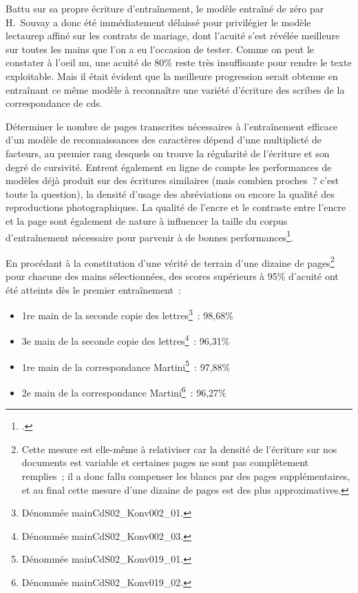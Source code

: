 \documentclass[a4paper,12pt,twoside]{book}
\begin{document}
				Battu sur sa propre écriture d'entraînement, le modèle entraîné de zéro par H.~Souvay a donc été immédiatement délaissé pour privilégier le modèle \gls{lectaurep} affiné sur les contrats de mariage, dont l'acuité s'est révélée meilleure sur toutes les mains que l'on a eu l'occasion de tester. Comme on peut le constater à l'oeil nu, une acuité de 80\% reste très insuffisante pour rendre le texte exploitable. Mais il était évident que la meilleure progression serait obtenue en entraînant ce même modèle à reconnaître une variété d'écriture des scribes de la correspondance de \gls{cds}.
				
				Déterminer le nombre de pages transcrites nécessaires à l'entraînement efficace d'un modèle de reconnaissances des caractères dépend d'une multiplicté de facteurs, au premier rang desquels on trouve la régularité de l'écriture et son degré de cursivité. Entrent également en ligne de compte les performances de modèles déjà produit sur des écritures similaires (mais combien proches~? c'est toute la question), la densité d'usage des abréviations ou encore la qualité des reproductions photographiques. La qualité de l'encre et le contraste entre l'encre et la page sont également de nature à influencer la taille du corpus d'entraînement nécessaire pour parvenir à de bonnes performances\footcite{stokesEScriptoriumVREManuscript2021}.
				
				En procédant à la constitution d'une vérité de terrain d'une dizaine de pages\footnote{Cette mesure est elle-même à relativiser car la densité de l'écriture sur nos documents est variable et certaines pages ne sont pas complètement remplies~; il a donc fallu compenser les blancs par des pages supplémentaires, et au final cette mesure d'une dizaine de pages est des plus approximatives.} pour chacune des mains sélectionnées, des scores supérieurs à 95\% d'acuité ont été atteints dès le premier entraînement~:
				
				\begin{itemize}
					\item 1re main de la seconde copie des lettres\footnote{Dénommée \textsf{mainCdS02\_Konv002\_01}.}~: 98,68\%
					\item 3e main de la seconde copie des lettres\footnote{Dénommée \textsf{mainCdS02\_Konv002\_03}.}~: 96,31\%
					\item 1re main de la correspondance Martini\footnote{Dénommée \textsf{mainCdS02\_Konv019\_01}.}~: 97,88\%
					\item 2e main de la correspondance Martini\footnote{Dénommée \textsf{mainCdS02\_Konv019\_02}.}~: 96,27\%
				\end{itemize}
			
\end{document}
